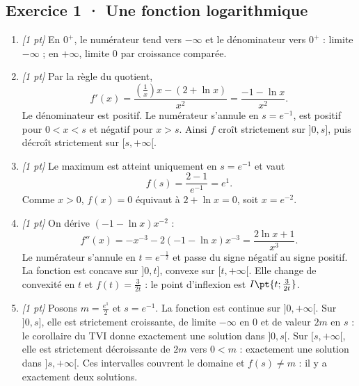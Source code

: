 \subsection*{Exercice 1 · Une fonction logarithmique}\begin{enumerate}

\item \textit{[1 pt]} En $0^+$, le numérateur tend vers $-\infty$ et le dénominateur vers $0^+$ : limite $-\infty$ ; en $+\infty$, limite $0$ par croissance comparée.

\item \textit{[1 pt]} Par la règle du quotient,
\[f'(x)=\frac{(\frac{1}{x})x-(2+\ln x)}{x^2}=\frac{-1-\ln x}{x^2}.\]
Le dénominateur est positif. Le numérateur s'annule en $s=e^{-1}$, est positif pour $0<x<s$ et négatif pour $x>s$. Ainsi $f$ croît strictement sur $]0,s]$, puis décroît strictement sur $[s,+\infty[$.

\item \textit{[1 pt]} Le maximum est atteint uniquement en $s=e^{-1}$ et vaut
\[f(s)=\frac{2- 1}{e^{-1}}=e^{1}.\]
Comme $x>0$, $f(x)=0$ équivaut à $2+\ln x=0$, soit $x=e^{-2}$.

\item \textit{[1 pt]} On dérive $(-1-\ln x)x^{-2}$ :
\[f''(x)=-x^{-3}-2(-1-\ln x)x^{-3}=\frac{2\ln x+1}{x^3}.\]
Le numérateur s'annule en $t=e^{-\frac{1}{2}}$ et passe du signe négatif au signe positif. La fonction est concave sur $]0,t]$, convexe sur $[t,+\infty[$. Elle change de convexité en $t$ et $f(t)=\frac{3}{2t}$ : le point d'inflexion est $I\pt{t;\frac{3}{2t}}$.

\item \textit{[1 pt]} Posons $m=\frac{e^{1}}{2}$ et $s=e^{-1}$. La fonction est continue sur $]0,+\infty[$. Sur $]0,s]$, elle est strictement croissante, de limite $-\infty$ en $0$ et de valeur $2m$ en $s$ : le corollaire du TVI donne exactement une solution dans $]0,s[$. Sur $[s,+\infty[$, elle est strictement décroissante de $2m$ vers $0<m$ : exactement une solution dans $]s,+\infty[$. Ces intervalles couvrent le domaine et $f(s)\ne m$ : il y a exactement deux solutions.

\end{enumerate}

